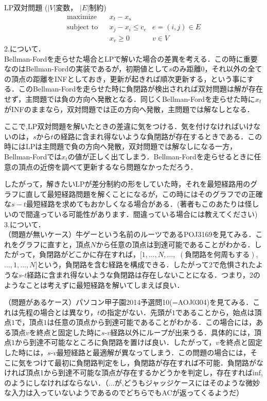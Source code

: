 \documentclass[13pt]{jarticle}
\theoremstyle{nonitalic} %
\begin{document}
LP双対問題
($|V|$変数， $|E|$制約)
\begin{align}
 &&&&&\textrm{maximize}   && x_t - x_s \\
 &&&&&\textrm{subject to} && x_j - x_i\leq c_e & e = (i,j) \in E  &&&&&\\
 &&&&&                    && x_v \geq 0 & v \in V &&&&&
\end{align}
2.について．\\
 Bellman-Fordを走らせた場合とLPで解いた場合の差異を考える．この時に重要なのはBellman-Fordの実装であるが，初期値として$s$のみ距離$0$，それ以外の全ての頂点の距離をINFとしておき，更新が起きれば順次更新する，という事にする．このBellman-Fordを走らせた時に負閉路が検出されれば双対問題は解が存在せず，主問題では負の方向へ発散となる．同じくBellman-Fordを走らせた時に$x_t$がINFのままなら，双対問題では正の方向へ発散，主問題では解なしとなる．

ここで,LP双対問題を解いたときの差違に気をつける．気を付けなければいけないのは，$s$から$t$の経路に含まれ得ないような負閉路が存在するときである．この時にはLPは主問題で負の方向へ発散，双対問題では解なしになる一方，Bellman-Fordでは$x_t$の値が正しく出てしまう．Bellman-Fordを走らせるときに任意の頂点の近傍を調べて更新するなら問題なかっただろう．

したがって，解きたいLPが差分制約の形をしていた時，それを最短経路用のグラフに直して最短経路問題を解くことになるが，この時にはそのグラフでの正確な$s-t$最短経路を求めてもおかしくなる場合がある．(著者もこのあたりは怪しいので間違っている可能性があります．間違っている場合には教えてください)\\

3.について．\\

（問題が無いケース）牛ゲーという名前のルーツであるPOJ3169を見てみる．これをグラフに直すと，頂点$N$から任意の頂点は到達可能であることがわかる．したがって，負閉路がどこかに存在すれば，[$1, \dots ,N,\dots,$ $ ( \textrm{負閉路を何周もする} ),$ $\dots ,1, \dots, N$]という，負閉路を含む経路を構成できる．したがって2で危惧されたような$s$-$t$経路に含まれ得ないような負閉路は存在しないことになる．つまり，2のようなことは考えずに最短経路を解いてしまえば良い．

（問題があるケース）パソコン甲子園2014予選問10(=AOJ0304)を見てみる．これは先程の場合とは異なり，$t$の指定がない．先頭が$1$であることから，始点は頂点$1$で，頂点$1$は任意の頂点から到達可能であることがわかる．この場合には，ある頂点$v$を終点と固定した時に$s$-$v$経路以外にループが出来うる．具体的には，頂点$1$から到達不可能なところに負閉路を置けば良い．したがって，$v$を終点と固定した時には，$s$-$v$最短経路と最適解が異なってしまう．この問題の場合には，そこに気をつけて最初に負閉路判定をし，負閉路が存在すれば不可能．負閉路がなければ頂点1から到達不可能な頂点が存在するかどうかを判定し，存在すればinf,のようにしなければならない．（...が,どうもジャッジケースにはそのような微妙な入力は入っていないようであるのでどちらでもACが返ってくるようだ）
\end{document}
